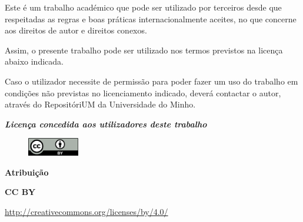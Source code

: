 Este é um trabalho académico que pode ser utilizado por terceiros desde que respeitadas as regras e boas práticas internacionalmente aceites, no que concerne aos direitos de autor e direitos conexos.

Assim, o presente trabalho pode ser utilizado nos termos previstos na licença abaixo indicada.

Caso o utilizador necessite de permissão para poder fazer um uso do trabalho em condições não previstas
no licenciamento indicado, deverá contactar o autor, através do RepositóriUM da Universidade do Minho.

\textit{\textbf{Licença concedida aos utilizadores deste trabalho}}

\begin{figure}[H]
    \includegraphics[width=0.2\textwidth]{img/licenca.png}
\end{figure}

\vspace{-0.5cm}

\noindent\textbf{Atribuição}

\noindent\textbf{CC BY}

\noindent\url{http://creativecommons.org/licenses/by/4.0/}
